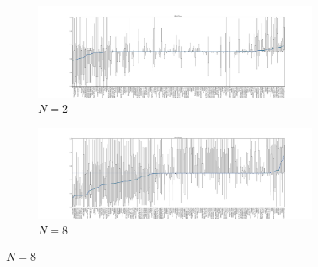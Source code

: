 \documentclass{article}
\begin{document}
\begin{figure}[!hbtp]
    \centering
    \begin{subfigure}[t]{\textwidth}
        \centering
        \includegraphics[width=\textwidth]{../img/boxplot_2_coexist.pdf}
        \caption{\(N=2\)}
    \end{subfigure}%



    \begin{subfigure}[htbp]{\textwidth}
        \centering
        \includegraphics[width=\textwidth]{../img/boxplot_8_coexist.pdf}
        \caption{\(N=8\)}
    \end{subfigure}%




\end{figure}
\end{document}
